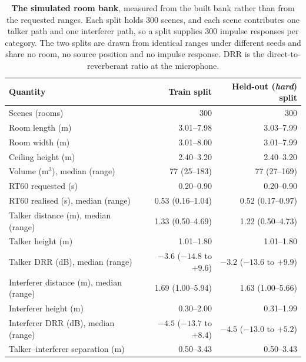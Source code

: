 \documentclass{article}
\begin{document}
\begin{table}[H]
    \centering
    \caption{\textbf{The simulated room bank}, measured from the built bank rather than from the requested ranges. Each split holds 300 scenes, and each scene contributes one talker path and one interferer path, so a split supplies 300 impulse responses per category. The two splits are drawn from identical ranges under different seeds and share no room, no source position and no impulse response. DRR is the direct-to-reverberant ratio at the microphone.}
    \label{tab:rirbank}
    \small
    \begin{tabular}{lrr}
        \toprule
        Quantity & Train split & Held-out (\emph{hard}) split \\
        \midrule
        Scenes (rooms) & 300 & 300 \\
        Room length (m) & 3.01--7.98 & 3.03--7.99 \\
        Room width (m) & 3.01--8.00 & 3.01--7.99 \\
        Ceiling height (m) & 2.40--3.20 & 2.40--3.20 \\
        Volume (m$^3$), median (range) & 77 (25--183) & 77 (27--169) \\
        RT60 requested (s) & 0.20--0.90 & 0.20--0.90 \\
        RT60 realised (s), median (range) & 0.53 (0.16--1.04) & 0.52 (0.17--0.97) \\
        \midrule
        Talker distance (m), median (range) & 1.33 (0.50--4.69) & 1.22 (0.50--4.73) \\
        Talker height (m) & 1.01--1.80 & 1.01--1.80 \\
        Talker DRR (dB), median (range) & $-3.6$ ($-14.8$ to $+9.6$) & $-3.2$ ($-13.6$ to $+9.9$) \\
        Interferer distance (m), median (range) & 1.69 (1.00--5.94) & 1.63 (1.00--5.66) \\
        Interferer height (m) & 0.30--2.00 & 0.31--1.99 \\
        Interferer DRR (dB), median (range) & $-4.5$ ($-13.7$ to $+8.4$) & $-4.5$ ($-13.0$ to $+5.2$) \\
        Talker--interferer separation (m) & 0.50--3.43 & 0.50--3.43 \\
        \bottomrule
    \end{tabular}
\end{table}
\end{document}
